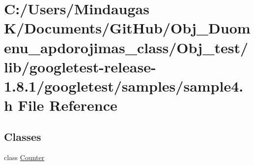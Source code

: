\hypertarget{_obj__test_2lib_2googletest-release-1_88_81_2googletest_2samples_2sample4_8h}{}\section{C\+:/\+Users/\+Mindaugas K/\+Documents/\+Git\+Hub/\+Obj\+\_\+\+Duomenu\+\_\+apdorojimas\+\_\+class/\+Obj\+\_\+test/lib/googletest-\/release-\/1.8.1/googletest/samples/sample4.h File Reference}
\label{_obj__test_2lib_2googletest-release-1_88_81_2googletest_2samples_2sample4_8h}
\subsection*{Classes}
\begin{DoxyCompactItemize}
\item 
class \mbox{\hyperlink{class_counter}{Counter}}
\end{DoxyCompactItemize}
